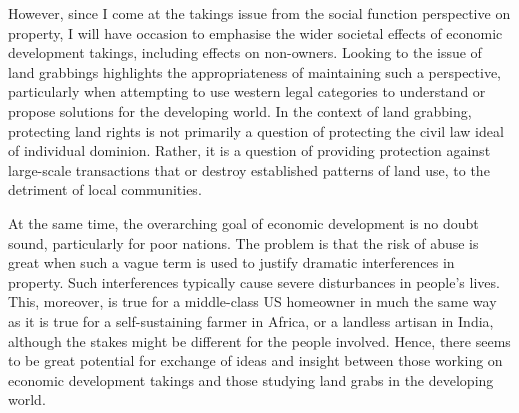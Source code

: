 However, since I come at the takings issue from the social function perspective on property, I will have occasion to emphasise the wider societal effects of economic development takings, including effects on non-owners. Looking to the issue of land grabbings highlights the appropriateness of maintaining such a  perspective, particularly when attempting to use western legal categories to understand or propose solutions for the developing world. In the context of land grabbing, protecting land rights is not primarily a question of protecting the civil law ideal of individual dominion. Rather, it is a question of providing protection against large-scale transactions that  or destroy established patterns of land use, to the detriment of local communities. 


At the same time, the overarching goal of economic development is no doubt sound, particularly for poor nations. The problem is that the risk of abuse is great when such a vague term is used to justify dramatic interferences in property. Such interferences typically cause severe disturbances in people's lives. This, moreover, is true for a middle-class US homeowner in much the same way as it is true for a self-sustaining farmer in Africa, or a landless artisan in India, although the stakes might be different for the people involved. Hence, there seems to be great potential for exchange of ideas and insight between those working on economic development takings and those studying land grabs in the developing world.



